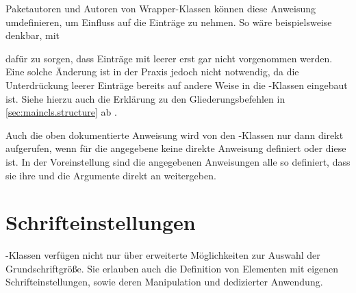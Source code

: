 Paketautoren und Autoren von Wrapper-Klassen können diese Anweisung
umdefinieren, um Einfluss auf die Einträge zu nehmen. So
wäre beispielsweise denkbar, mit
\begin{lstcode}
  \renewcommand{\addtocentrydefault}[3]{%
    \IfArgIsEmpty{#3}{%
    }{%
      \IfArgIsEmpty{#2}{%
        \addcontentsline{toc}{#1}{\protect\nonumberline#3}%
      }{%
        \addcontentsline{toc}{#1}{\protect\numberline{#2}#3}%
      }%
    }%
  }%
\end{lstcode}
dafür zu sorgen, dass Einträge mit leerer
 erst gar nicht vorgenommen werden. Eine solche Änderung
ist in der Praxis jedoch nicht notwendig, da die Unterdrückung leerer Einträge
bereits auf andere Weise in die \KOMAScript-Klassen eingebaut ist. Siehe
hierzu auch die Erklärung zu den Gliederungsbefehlen in
\autoref{sec:maincls.structure} ab .%
%
\EndIndexGroup


\begin{Declaration}
\end{Declaration}%
Auch  die oben dokumentierte Anweisung
%
 wird von den
\KOMAScript-Klassen nur dann direkt aufgerufen, wenn für die angegebene
 keine direkte Anweisung definiert oder diese
 ist. In der
Voreinstellung sind die angegebenen Anweisungen alle so definiert, dass sie
ihre  und die Argumente direkt an
 weitergeben.%
%
\EndIndexGroup


\section{Schrifteinstellungen}

\KOMAScript-Klassen verfügen nicht nur über erweiterte Möglichkeiten zur
Auswahl der Grundschriftgröße. Sie erlauben auch die Definition von Elementen
mit eigenen Schrifteinstellungen, sowie deren Manipulation und dedizierter
Anwendung.

